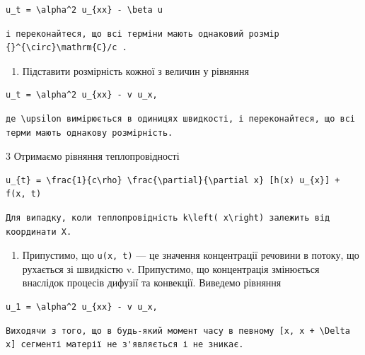 \documentclass[
  ukrainian,
]{article}
\providecommand{\tightlist}{%
  \setlength{\itemsep}{0pt}\setlength{\parskip}{0pt}}
\begin{document}
\begin{verbatim}
u_t = \alpha^2 u_{xx} - \beta u
\end{verbatim}

\begin{verbatim}
і переконайтеся, що всі терміни мають однаковий розмір {}^{\circ}\mathrm{C}/c .
\end{verbatim}

\begin{enumerate}
\def\labelenumi{\arabic{enumi}.}
\setcounter{enumi}{1}
\tightlist
\item
  Підставити розмірність кожної з величин у рівняння
\end{enumerate}

\begin{verbatim}
u_t = \alpha^2 u_{xx} - v u_x,
\end{verbatim}

\begin{verbatim}
де \upsilon вимірюється в одиницях швидкості, і переконайтеся, що всі терми мають однакову розмірність.
\end{verbatim}

3 Отримаємо рівняння теплопровідності

\begin{verbatim}
u_{t} = \frac{1}{c\rho} \frac{\partial}{\partial x} [h(x) u_{x}] + f(x, t)
\end{verbatim}

\begin{verbatim}
Для випадку, коли теплопровідність k\left( x\right) залежить від координати X.
\end{verbatim}

\begin{enumerate}
\def\labelenumi{\arabic{enumi}.}
\setcounter{enumi}{3}
\tightlist
\item
  Припустимо, що \texttt{u(x,\ t)} --- це значення концентрації речовини
  в потоку, що рухається зі швидкістю v. Припустимо, що концентрація
  змінюється внаслідок процесів дифузії та конвекції. Виведемо рівняння
\end{enumerate}

\begin{verbatim}
u_1 = \alpha^2 u_{xx} - v u_x,
\end{verbatim}

\begin{verbatim}
Виходячи з того, що в будь-який момент часу в певному [x, x + \Delta x] сегменті матерії не з'являється і не зникає.
\end{verbatim}
\end{document}
